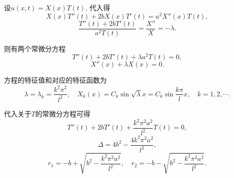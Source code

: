 \documentclass[11pt,a4paper]{article}
\begin{document}
设$u(x,t)=X(x)T(t)$, 代入得
$$X(x)T''(t)+2bX(x)T'(t)=a^2X''(x)T(t),$$
$$\frac{T''(t)+2bT'(t)}{a^2T(t)}=\frac{X''}{X}=-\lambda.$$

则有两个常微分方程
$$T''(t)+2bT'(t)+\lambda a^2T(t)=0,$$
$$X''(x)+\lambda X(x)=0.$$

方程的特征值和对应的特征函数为
$$\lambda=\lambda_k=\frac{k^2\pi^2}{l^2},\quad X_k(x)=C_k\sin\sqrt{\lambda}x=C_k\sin\frac{k\pi}{l}x,\quad k=1,2,\cdots.$$

代入关于$T$的常微分方程可得
$$T''(t)+2bT'(t)+\frac{k^2\pi^2a^2}{l^2}T(t)=0,$$
$$\Delta=4b^2-\frac{4k^2\pi^2a^2}{l^2},$$
$$r_1=-b+\sqrt{b^2-\frac{k^2\pi^2a^2}{l^2}},\quad r_2=-b-\sqrt{b^2-\frac{k^2\pi^2a^2}{l^2}}.$$
\end{document}
